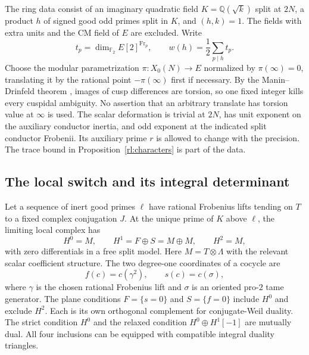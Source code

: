 The ring data consist of an imaginary quadratic field \(K=\mathbb Q(\sqrt k)\)
split at \(2N\), a product \(h\) of signed good odd primes split in \(K\),
and \((h,k)=1\).  The fields with extra units and the CM field of \(E\)
are excluded.  Write
\begin{equation}
 t_p=\dim_{\mathbb F_2} E[2]^{\operatorname{Fr}_p},\qquad
 w(h)=\frac12\sum_{p\mid h}t_p.
\label{rd:weights}
\end{equation}
Choose the modular parametrization \(\pi:X_0(N)\to E\)
normalized by \(\pi(\infty)=0\), translating it by the rational
point \(-\pi(\infty)\) first if necessary.  By the Manin--Drinfeld theorem
\cite{Manin1972,Drinfeld1973}, images of cusp
differences are torsion, so one fixed integer kills every
cuspidal ambiguity.  No assertion that an arbitrary translate
has torsion value at \(\infty\) is used.
The scalar deformation is trivial at \(2N\), has unit exponent on the
auxiliary conductor inertia, and odd exponent at the indicated split
conductor Frobenii.  Its auxiliary prime \(r\) is allowed to change with
the precision.  The trace bound in Proposition~\ref{rl:characters} is part of
the data.

\subsection{The local switch and its integral determinant}
\label{rd:local-subsection}

\begin{lemma}\label{rd:local-model}
Let a sequence of inert good primes \(\ell\) have rational Frobenius
lifts tending on \(T\) to a fixed complex conjugation \(J\).
At the unique prime of \(K\) above \(\ell\), the limiting local complex
has
\begin{equation}
 H^0=M,\qquad H^1=F\oplus S=M\oplus M,\qquad H^2=M,
 \label{rd:local-cohomology}
\end{equation}
with zero differentials in a free split model.  Here \(M=T\otimes\Lambda\)
with the relevant scalar coefficient structure.  The two degree-one
coordinates of a cocycle are
\begin{equation}
 f(c)=c(\gamma^2),\qquad s(c)=c(\sigma),
 \label{rd:coordinates}
\end{equation}
where \(\gamma\) is the chosen rational Frobenius lift and
\(\sigma\) is an oriented pro-\(2\) tame generator.  The plane
conditions \(F=\{s=0\}\) and \(S=\{f=0\}\) include \(H^0\) and exclude
\(H^2\).  Each is its own orthogonal complement for conjugate-Weil
duality.  The strict condition \(H^0\) and the relaxed condition
\(H^0\oplus H^1[-1]\) are mutually dual.  All four inclusions can be
equipped with compatible integral duality triangles.
\end{lemma}

